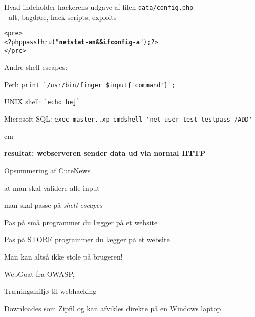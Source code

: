 \documentclass[20pt,landscape,a4paper,footrule]{foils}
\begin{document}
\begin{list1}
\item Hvad indeholder hackerens udgave af filen \verb+data/config.php+ \\
- alt, bagdøre, hack scripts, exploits
\end{list1}
\begin{alltt}
<pre>
<?php passthru("{\bfseries netstat -an && ifconfig -a}"); ?>
</pre>
\end{alltt}
\begin{list1}
\item Andre shell escapes:
\begin{list2}
\item Perl: \verb+print `/usr/bin/finger $input{'command'}`;+
\item UNIX shell: \verb+`echo hej`+
\item Microsoft SQL: \verb+exec master..xp_cmdshell 'net user test testpass /ADD'+
\end{list2}
\end{list1}

 cm

\centerline{\bfseries resultat: webserveren sender data ud via normal HTTP}




\begin{list1}
\item Opsummering af CuteNews
\begin{list2}
\item at man skal validere alle input
\item man skal passe på \emph{shell escapes}
\item Pas på små programmer du lægger på et website
\item Pas på STORE programmer du lægger på et website
\end{list2}
\item {\color{red}
Man kan altså ikke stole på brugeren!}
\end{list1}



\begin{list1}
\item WebGoat fra OWASP, 
\item Træningsmiljø til webhacking
\item Downloades som Zipfil og kan afvikles direkte på en Windows laptop
\end{list1}
\end{document}
